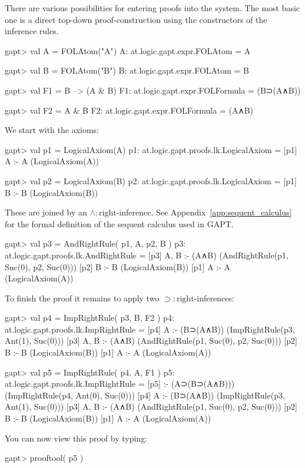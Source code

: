 \documentclass[a4paper,11pt]{article}
\newcommand{\impl}{\supset} %
\renewcommand{\land}{\wedge}
\begin{document}
There are various possibilities for entering proofs into the system. The most
basic one is a direct top-down proof-construction using the constructors
of the inference rules.
\begin{clilisting}
gapt> val A = FOLAtom("A")
A: at.logic.gapt.expr.FOLAtom = A

gapt> val B = FOLAtom("B")
B: at.logic.gapt.expr.FOLAtom = B

gapt> val F1 = B --> (A & B)
F1: at.logic.gapt.expr.FOLFormula = (B⊃(A∧B))

gapt> val F2 = A & B
F2: at.logic.gapt.expr.FOLFormula = (A∧B)

\end{clilisting}
%
We start with the axioms:
%
\begin{clilisting}
gapt> val p1 = LogicalAxiom(A)
p1: at.logic.gapt.proofs.lk.LogicalAxiom =
[p1] A :- A    (LogicalAxiom(A))

gapt> val p2 = LogicalAxiom(B)
p2: at.logic.gapt.proofs.lk.LogicalAxiom =
[p1] B :- B    (LogicalAxiom(B))

\end{clilisting}
%
These are joined by an $\land:\mathrm{right}$-inference. See Appendix~\ref{app:sequent_calculus}
for the formal definition of the sequent calculus used in GAPT.
\begin{clilisting}
gapt> val p3 = AndRightRule( p1, A, p2, B )
p3: at.logic.gapt.proofs.lk.AndRightRule =
[p3] A, B :- (A∧B)    (AndRightRule(p1, Suc(0), p2, Suc(0)))
[p2] B :- B    (LogicalAxiom(B))
[p1] A :- A    (LogicalAxiom(A))

\end{clilisting}
%
To finish the proof it remains to apply two $\impl:\mathrm{right}$-inferences:
%
\begin{clilisting}
gapt> val p4 = ImpRightRule( p3, B, F2 )
p4: at.logic.gapt.proofs.lk.ImpRightRule =
[p4] A :- (B⊃(A∧B))    (ImpRightRule(p3, Ant(1), Suc(0)))
[p3] A, B :- (A∧B)    (AndRightRule(p1, Suc(0), p2, Suc(0)))
[p2] B :- B    (LogicalAxiom(B))
[p1] A :- A    (LogicalAxiom(A))

gapt> val p5 = ImpRightRule( p4, A, F1 )
p5: at.logic.gapt.proofs.lk.ImpRightRule =
[p5]  :- (A⊃(B⊃(A∧B)))    (ImpRightRule(p4, Ant(0), Suc(0)))
[p4] A :- (B⊃(A∧B))    (ImpRightRule(p3, Ant(1), Suc(0)))
[p3] A, B :- (A∧B)    (AndRightRule(p1, Suc(0), p2, Suc(0)))
[p2] B :- B    (LogicalAxiom(B))
[p1] A :- A    (LogicalAxiom(A))

\end{clilisting}
%
You can now view this proof by typing:
\begin{clilisting}
gapt> prooftool( p5 )

\end{clilisting}
\end{document}

